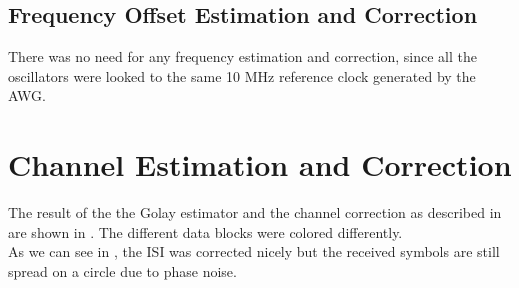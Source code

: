 \subsection{Frequency Offset Estimation and Correction}
There was no need for any frequency estimation and correction, since all the
oscillators were looked to the same 10 MHz reference clock generated
by the \gls{AWG}. \\

\section{Channel Estimation and Correction}
The result of the the Golay estimator and the channel correction
as described in  are shown in .
The different data blocks were colored differently. \\

As we can see in , the \gls{ISI} was
corrected nicely but the received symbols are still spread on a circle
due to phase noise. \\

